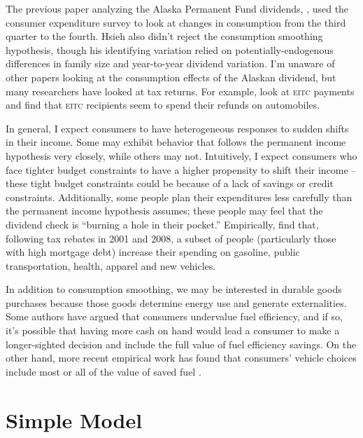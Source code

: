 \documentclass[11pt,letterpaper,oneside]{article}
\newcommand{\eitc}{\textsc{eitc}}
\begin{document}
\begin{doublespacing}
The previous paper analyzing the Alaska Permanent Fund dividends, \textcite{hsieh2003}, used the consumer expenditure survey to look at changes in consumption from the third quarter to the fourth.
Hsieh also didn't reject the consumption smoothing hypothesis, though his identifying variation relied on potentially\hyp{}endogenous differences in family size and year\hyp{}to\hyp{}year dividend variation.
I'm unaware of other papers looking at the consumption effects of the Alaskan dividend, but many researchers have looked at tax returns.
For example, \textcite{goodman2008eitc} look at \eitc{} payments and find that \eitc{} recipients seem to spend their refunds on automobiles.

In general, I expect consumers to have heterogeneous responses to sudden shifts in their income.
Some may exhibit behavior that follows the permanent income hypothesis very closely, while others may not.
Intuitively, I expect consumers who face tighter budget constraints to have a higher propensity to shift their income -- these tight budget constraints could be because of a lack of savings or credit constraints.
Additionally, some people plan their expenditures less carefully than the permanent income hypothesis assumes; these people may feel that the dividend check is ``burning a hole in their pocket.''
Empirically, \textcite{misra2014consumption} find that, following tax rebates in 2001 and 2008, a subset of people (particularly those with high mortgage debt) increase their spending on gasoline, public transportation, health, apparel and new vehicles.




In addition to consumption smoothing, we may be interested in durable goods purchases because those goods determine energy use and generate externalities.
Some authors have argued that consumers undervalue fuel efficiency, and if so, it's possible that having more cash on hand would lead a consumer to make a longer\hyp{}sighted decision and include the full value of fuel efficiency savings.
On the other hand, more recent empirical work has found that consumers' vehicle choices include most or all of the value of saved fuel \parencite{busse2013consumers, allcott2014gasoline, grigolon2014consumer, sallee2016consumers}.



\section{Simple Model}
\label{sec:model}


\end{doublespacing}
\end{document}
